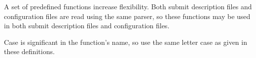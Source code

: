 
\MoreTodo

A set of predefined functions increase flexibility.
Both submit description files and configuration files are read using
the same parser,
so these functions may be used in both submit description files and
configuration files.

Case is significant in the function's name, so use the
same letter case as given in these definitions.

